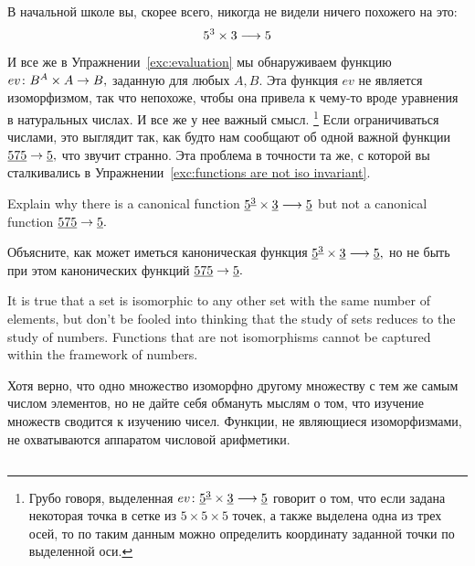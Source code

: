 \documentclass[CT4S-EN-RU]{subfiles}
\begin{document}
\begin{blockRUS}
В начальной школе вы, скорее всего, никогда не видели ничего похожего на это:
$$5^3\times 3\longrightarrow 5$$
И все же в Упражнении~\ref{exc:evaluation} мы обнаруживаем функцию $ev\colon B^A\times A\rightarrow B,$ заданную для любых $A,B.$ Эта функция $ev$ не является изоморфизмом, так что непохоже, чтобы она привела к чему-то вроде уравнения в натуральных числах. И все же у нее важный смысл.%
\footnote{Грубо говоря, выделенная $ev\colon\underline{5}^{\underline{3}}\times\underline{3}\longrightarrow \underline{5}$ говорит о том, что если задана некоторая точка в сетке из $5\times 5\times 5$ точек, а также выделена одна из трех осей, то по таким данным можно определить координату заданной точки по выделенной оси.}
Если ограничиваться числами, это выглядит так, как будто нам сообщают об одной важной функции $\underline{575}\rightarrow\underline{5},$ что звучит странно. Эта проблема в точности та же, с которой вы сталкивались в Упражнении~\ref{exc:functions are not iso invariant}.
\end{blockRUS}

\begin{exerciseENG}
Explain why there is a canonical function $\underline{5}^{\underline{3}}\times\underline{3}\longrightarrow \underline{5}$ but not a canonical function $\underline{575}\rightarrow\underline{5}.$
\end{exerciseENG}

\begin{exerciseRUS}
Объясните, как может иметься каноническая функция $\underline{5}^{\underline{3}}\times\underline{3}\longrightarrow \underline{5},$ но не быть при этом канонических функций $\underline{575}\rightarrow\underline{5}.$
\end{exerciseRUS}

\begin{sloganENG}
It is true that a set is isomorphic to any other set with the same number of elements, but don't be fooled into thinking that the study of sets reduces to the study of numbers. Functions that are not isomorphisms cannot be captured within the framework of numbers. 
\end{sloganENG}

\begin{sloganRUS}
Хотя верно, что одно множество изоморфно другому множеству с тем же самым числом элементов, но не дайте себя обмануть мыслям о том, что изучение множеств сводится к изучению чисел. Функции, не являющиеся изоморфизмами, не охватываются аппаратом числовой арифметики. 
\end{sloganRUS}


\subsection{}
\end{document}
